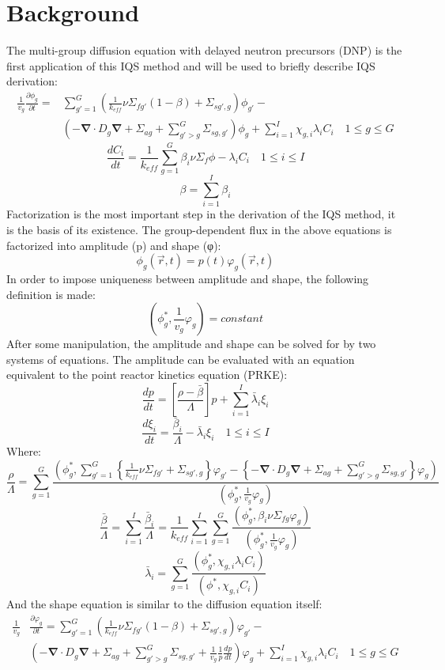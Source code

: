 \documentclass[12pt]{scrartcl}
\renewcommand{\div}{\bs{\nabla}\! \cdot \!}
\newcommand{\grad}{\bs{\nabla}}
\newcommand{\bs}[1]{\mathbf{#1}}
\newcommand{\be}{\begin{equation}}
\newcommand{\ee}{\end{equation}}
\begin{document}
\section{Background}
The multi-group diffusion equation with delayed neutron precursors (DNP) is the first application of this IQS method and will be used to briefly describe IQS derivation:
\begin{align}
\frac{1}{v_g} \frac{\partial \phi_g }{\partial t} =& \sum_{g'=1}^G\left(\frac{1}{k_{eff}}\nu \Sigma_{fg'}(1-\beta)+\Sigma_{sg',g}\right) \phi_{g'} - \nonumber \\
& \left( -\div D_g \grad  + \Sigma_{ag}  + \sum_{g'>g}^G\Sigma_{sg,g'} \right)\phi_g + \sum_{i=1}^I\chi_{g,i}\lambda_i C_i \quad 1 \le g \le G 
\end{align}
\be
\frac{dC_i}{dt} = \frac{1}{k_{eff}}\sum_{g=1}^G\beta_i\nu \Sigma_f \phi - \lambda_i C_i \quad 1 \le i \le I 
\ee
\be
\beta = \sum_{i=1}^I \beta_i 
\ee
Factorization is the most important step in the derivation of the IQS method, it is the basis of its existence.  The group-dependent flux in the above equations is factorized into amplitude (p) and shape (φ):
\be
\phi_g(\vec{r},t)=p(t)\varphi_g(\vec{r},t)
\ee
In order to impose uniqueness between amplitude and shape, the following definition is made:
\be
\left(\phi_g^*,\frac{1}{v_g}\varphi_g\right)=constant
\ee
After some manipulation, the amplitude and shape can be solved for by two systems of equations.  The amplitude can be evaluated with an equation equivalent to the point reactor kinetics equation (PRKE):
\be
\frac{dp}{dt}=\left[\frac{\rho-\bar{\beta}}{\Lambda}\right]p+\sum_{i=1}^I\bar{\lambda}_i\xi_i
\ee
\be
\frac{d\xi_i}{dt}=\frac{\bar{\beta}_i}{\Lambda}-\bar{\lambda}_i\xi_i \quad 1 \le i \le I 
\ee
Where:
\be
\frac{\rho}{\Lambda}=\sum_{g=1}^G\frac{ \left(\phi_g^*,\sum_{g'=1}^G\left\{\frac{1}{k_{eff}} \nu \Sigma_{fg'}+\Sigma_{sg',g}\right\}\varphi_{g'} -\left\{ -\div D_g \grad+\Sigma_{ag}+\sum_{g'>g}^G\Sigma_{sg,g'}\right\}\varphi_g\right)}{\left(\phi_g^*,\frac{1}{v_g}\varphi_g\right)}
\ee
\be
\frac{\bar{\beta}}{\Lambda}=\sum_{i=1}^I\frac{\bar{\beta}_i}{\Lambda}=\frac{1}{k_{eff}}\sum_{i=1}^I\sum_{g=1}^G\frac{(\phi_g^*,\beta_i\nu\Sigma_{fg}\varphi_g)}{\left(\phi_g^*,\frac{1}{v_g}\varphi_g\right)}
\ee
\be
\bar{\lambda}_i=\sum_{g=1}^G\frac{(\phi_g^*,\chi_{g,i}\lambda_iC_i)}{(\phi^*,\chi_{g,i}C_i)}
\ee
And the shape equation is similar to the diffusion equation itself:
\begin{align}
\frac{1}{v_g}& \frac{\partial \varphi_g }{\partial t} = \sum_{g'=1}^G\left(\frac{1}{k_{eff}}\nu \Sigma_{fg'}(1-\beta)+\Sigma_{sg',g}\right) \varphi_{g'} - \nonumber \\
& \left( -\div D_g \grad  + \Sigma_{ag}  + \sum_{g'>g}^G\Sigma_{sg,g'} + \frac{1}{v_g}\frac{1}{p}\frac{dp}{dt} \right)\varphi_g + \sum_{i=1}^I\chi_{g,i}\lambda_i C_i \quad 1 \le g \le G 
\label{eq:shape}
\end{align}
\end{document}
